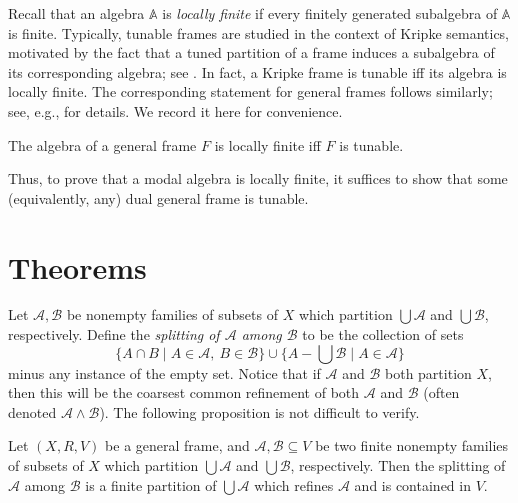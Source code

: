 \documentclass[submission]{eptcs}
\begin{document}
    Recall that an algebra $\mathbb{A}$ is \textit{locally finite} if every finitely generated subalgebra of $\mathbb{A}$ is finite.
    Typically, tunable frames are studied in the context of Kripke semantics,
    motivated by the fact that a tuned partition of a frame induces a subalgebra of its corresponding algebra; see \cite[Corollary 3.3]{Blok_1980}.
    In fact, a Kripke frame is tunable iff its algebra is locally finite.
    The corresponding statement for general frames follows similarly; see, e.g., \cite[Corollary 4.13]{Shapirovsky_2025} for details. 
    We record it here for convenience.

    \begin{proposition}
        The algebra of a general frame $F$ is locally finite iff $F$ is tunable.
    \end{proposition}
    Thus, to prove that a modal algebra is locally finite, it suffices to show that some (equivalently, any) dual general frame is tunable.

\section{Theorems}

Let $\mathcal{A},\mathcal{B}$ be nonempty families of subsets of $X$ which partition $\bigcup\mathcal{A}$ and $\bigcup\mathcal{B}$, respectively. 
Define the \textit{splitting of $\mathcal{A}$ among $\mathcal{B}$} to be the collection of sets
\[
\{A \cap B \mid A \in \mathcal{A},\ B \in \mathcal{B}\}\cup
\{A-\bigcup \mathcal{B} \mid A \in \mathcal{A}\}
\]
minus any instance of the empty set. Notice that if $\mathcal{A}$ and $\mathcal{B}$ both partition $X$, then this will be the coarsest common refinement of both $\mathcal{A}$ and $\mathcal{B}$ (often denoted $\mathcal{A} \wedge \mathcal{B}$).
The following proposition is not difficult to verify.

\begin{proposition} \label{prop:splitting}
    Let $(X,R,V)$ be a general frame, and $\mathcal{A},\mathcal{B} \subseteq V$ be two finite nonempty families of subsets of $X$ which partition $\bigcup \mathcal{A}$ and $\bigcup \mathcal{B}$, respectively.
    Then the splitting of $\mathcal{A}$ among $\mathcal{B}$ is a finite partition of $\bigcup \mathcal{A}$ which refines $\mathcal{A}$ and is contained in $V$.
\end{proposition}
\end{document}

